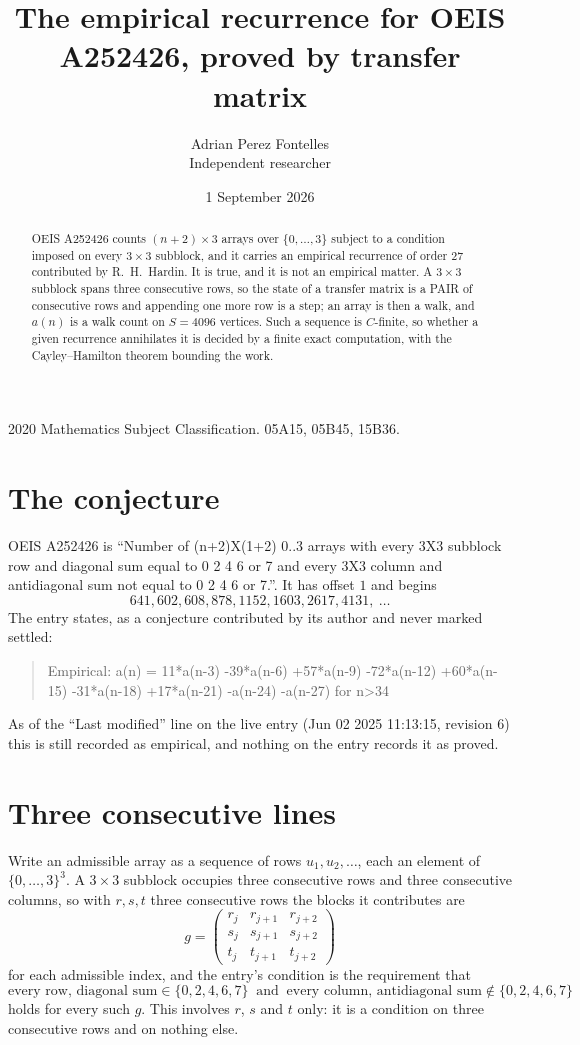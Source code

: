 \documentclass[11pt,a4paper]{article}
\title{The empirical recurrence for OEIS A252426, proved by transfer matrix}
\author{Adrian Perez Fontelles\\ \small Independent researcher}
\date{1 September 2026}
\theoremstyle{plain}
\theoremstyle{definition}
\begin{document}
\maketitle

\begin{abstract}
OEIS A252426 counts $(n+2)\times3$ arrays over $\{0,\dots,3\}$ subject to a condition imposed on
every $3\times3$ subblock, and it carries an empirical recurrence of order $27$
contributed by R.~H.~Hardin. It is true, and it is not an empirical matter. A $3\times3$
subblock spans three consecutive rows, so the state of a transfer matrix is a PAIR of
consecutive rows and appending one more row is a step; an array is then a walk, and
$a(n)$ is a walk count on $S=4096$ vertices. Such a sequence is $C$-finite, so whether a given
recurrence annihilates it is decided by a finite exact computation, with the Cayley--Hamilton
theorem bounding the work.
\end{abstract}

\noindent\small 2020 Mathematics Subject Classification. 05A15, 05B45, 15B36.\normalsize

\section{The conjecture}

OEIS A252426 is ``Number of (n+2)X(1+2) 0..3 arrays with every 3X3 subblock row and diagonal sum equal to 0 2 4 6 or 7 and every 3X3 column and antidiagonal sum not equal to 0 2 4 6 or 7.''. It has offset $1$ and begins
\[
641, 602, 608, 878, 1152, 1603, 2617, 4131,\ \dots
\]
The entry states, as a conjecture contributed by its author and never marked settled:
\begin{quote}
Empirical: a(n) = 11*a(n-3) -39*a(n-6) +57*a(n-9) -72*a(n-12) +60*a(n-15) -31*a(n-18) +17*a(n-21) -a(n-24) -a(n-27) for n>34
\end{quote}
As of the ``Last modified'' line on the live entry (Jun 02 2025 11:13:15, revision 6) this is still
recorded as empirical, and nothing on the entry records it as proved.

\section{Three consecutive lines}

Write an admissible array as a sequence of rows $u_1,u_2,\dots$, each an element of
$\{0,\dots,3\}^{3}$. A $3\times3$ subblock occupies three consecutive rows and
three consecutive columns, so with $r,s,t$ three consecutive rows the blocks it
contributes are
\[
g=\begin{pmatrix}r_j&r_{j+1}&r_{j+2}\\ s_j&s_{j+1}&s_{j+2}\\ t_j&t_{j+1}&t_{j+2}\end{pmatrix}
\]
for each admissible index, and the entry's condition is the requirement that
\[
\text{every row, diagonal sum} \in \{0,2,4,6,7\}\ \text{ and }\ \text{every column, antidiagonal sum} \notin \{0,2,4,6,7\}
\]
holds for every such $g$. This involves $r$, $s$ and $t$ only: it is a condition on
three consecutive rows and on nothing else.
\end{document}
